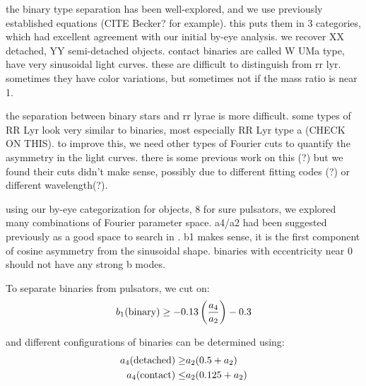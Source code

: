 \documentclass[]{emulateapj}
\begin{document}
the binary type separation has been well-explored, and we use previously established equations (CITE Becker? for example). this puts them in 3 categories, which had excellent agreement with our initial by-eye analysis. we recover XX detached, YY semi-detached objects. contact binaries are called W UMa type, have very sinusoidal light curves. these are difficult to distinguish from rr lyr. sometimes they have color variations, but sometimes not if the mass ratio is near 1.

the separation between binary stars and rr lyrae is more difficult. some types of RR Lyr look very similar to binaries, most especially RR Lyr type a (CHECK ON THIS).  to improve this, we need other types of Fourier cuts to quantify the asymmetry in the light curves. there is some previous work on this (\citep{aaas}?) but we found their cuts didn't make sense, possibly due to different fitting codes (?) or different wavelength(?). 

using our by-eye categorization for objects, 8 for sure pulsators, we explored many combinations of Fourier parameter space. a4/a2 had been suggested previously as a good space to search in \citep{asas}. b1 makes sense, it is the first component of cosine asymmetry from the sinusoidal shape. binaries with eccentricity near 0 should not have any strong b modes. 



To separate binaries from pulsators, we cut on:
\begin{equation}
b_1({\rm binary}) \ge  -0.13\left( \frac{a_4}{a_2} \right)- 0.3
\end{equation}

and different configurations of binaries can be determined using:
\begin{eqnarray}
a_4({\rm detached}) \ge & a_2(0.5 + a_2)\\
a_4({\rm contact}) \le & a_2(0.125 + a_2)
\end{eqnarray}







\end{document}
